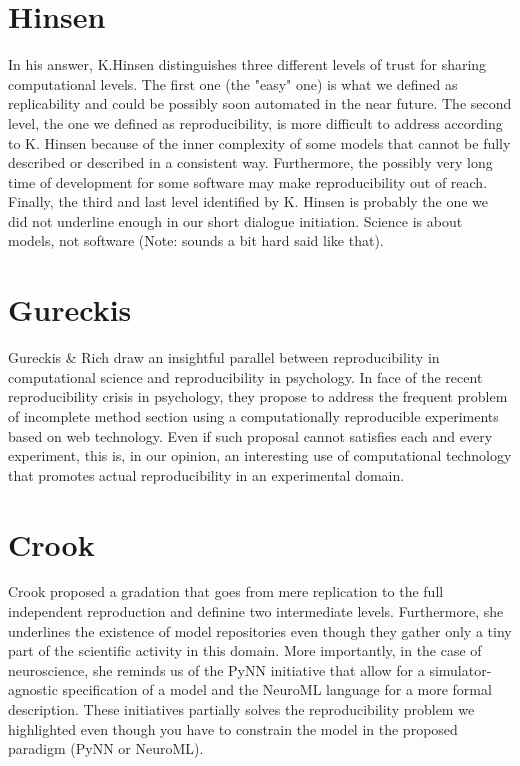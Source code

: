 \documentclass[jou]{apa6}
\begin{document}
\section{Hinsen}
In his answer, K.Hinsen distinguishes three different levels of trust for
sharing computational levels. The first one (the "easy" one) is what we defined
as replicability and could be possibly soon automated in the near future. The
second level, the one we defined as reproducibility, is more difficult to
address according to K. Hinsen because of the inner complexity of some models
that cannot be fully described or described in a consistent way. Furthermore,
the possibly very long time of development for some software may make
reproducibility out of reach. Finally, the third and last level identified by
K. Hinsen is probably the one we did not underline enough in our short dialogue
initiation. Science is about models, not software (Note: sounds a bit hard said
like that).

\section{Gureckis}
Gureckis \& Rich draw an insightful parallel between reproducibility in
computational science and reproducibility in psychology. In face of the recent
reproducibility crisis in psychology, they propose to address the frequent
problem of incomplete method section using a computationally reproducible
experiments based on web technology. Even if such proposal cannot satisfies
each and every experiment, this is, in our opinion, an interesting use of
computational technology that promotes actual reproducibility in an
experimental domain.

\section{Crook}
Crook proposed a gradation that goes from mere replication to the full
independent reproduction and definine two intermediate levels. Furthermore, she
underlines the existence of model repositories even though they gather only a
tiny part of the scientific activity in this domain. More importantly, in the
case of neuroscience, she reminds us of the PyNN initiative that allow for a
simulator-agnostic specification of a model and the NeuroML language for a more
formal description. These initiatives partially solves the reproducibility
problem we highlighted even though you have to constrain the model in the
proposed paradigm (PyNN or NeuroML).
\end{document}
